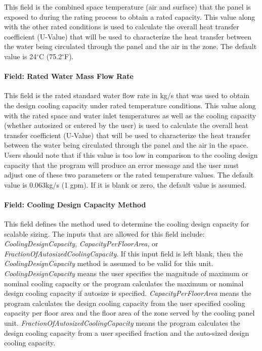 This field is the combined space temperature (air and surface) that the panel is exposed to during the rating process to obtain a rated capacity.  This value along with the other rated conditions is used to calculate the overall heat transfer coefficient (U-Value) that will be used to characterize the heat transfer between the water being circulated through the panel and the air in the zone.  The default value is 24$^\circ$C (75.2$^\circ$F).

\paragraph{Field: Rated Water Mass Flow Rate}\label{field-rated-water-mass-flow-rate}

This field is the rated standard water flow rate in kg/s that was used to obtain the design cooling capacity under rated temperature conditions.  This value along with the rated space and water inlet temperatures as well as the cooling capacity (whether autosized or entered by the user) is used to calculate the overall heat transfer coefficient (U-Value) that will be used to characterize the heat transfer between the water being circulated through the panel and the air in the space.  Users should note that if this value is too low in comparison to the cooling design capacity that the program will produce an error message and the user must adjust one of these two parameters or the rated temperature values.  The default value is 0.063kg/s (1 gpm).  If it is blank or zero, the default value is assumed.

\paragraph{Field: Cooling Design Capacity Method}\label{field-cooling-design-capacity-method-2}

This field defines the method used to determine the cooling design capacity for scalable sizing. The inputs that are allowed for this field include: \emph{CoolingDesignCapacity}, \emph{CapacityPerFloorArea}, or \emph{FractionOfAutosizedCoolingCapacity}. If this input field is left blank, then the \emph{CoolingDesignCapacity} method is assumed to be valid for this unit. \emph{CoolingDesignCapacity} means the user specifies the magnitude of maximum or nominal cooling capacity or the program calculates the maximum or nominal design cooling capacity if autosize is specified. \emph{CapacityPerFloorArea} means the program calculates the design cooling capacity from the user specified cooling capacity per floor area and the floor area of the zone served by the cooling panel unit. \emph{FractionOfAutosizedCoolingCapacity} means the program calculates the design cooling capacity from a user specified fraction and the auto-sized design cooling capacity.

